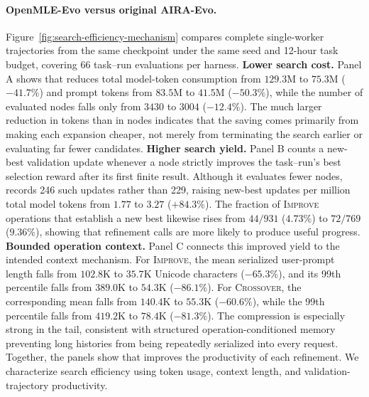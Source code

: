 \paragraph{OpenMLE-Evo versus original AIRA-Evo.}
Figure~\ref{fig:search-efficiency-mechanism} compares complete single-worker trajectories from the same \thirtyfivebmodel{} checkpoint under the same seed and 12-hour task budget, covering 66 task--run evaluations per harness.
\textbf{Lower search cost.}
Panel A shows that \openmleevo{} reduces total model-token consumption from $129.3$M to $75.3$M ($-41.7\%$) and prompt tokens from $83.5$M to $41.5$M ($-50.3\%$), while the number of evaluated nodes falls only from $3430$ to $3004$ ($-12.4\%$).
The much larger reduction in tokens than in nodes indicates that the saving comes primarily from making each expansion cheaper, not merely from terminating the search earlier or evaluating far fewer candidates.
\textbf{Higher search yield.}
Panel B counts a new-best validation update whenever a node strictly improves the task--run's best selection reward after its first finite result.
Although it evaluates fewer nodes, \openmleevo{} records 246 such updates rather than 229, raising new-best updates per million total model tokens from $1.77$ to $3.27$ ($+84.3\%$).
The fraction of \textsc{Improve} operations that establish a new best likewise rises from $44/931$ ($4.73\%$) to $72/769$ ($9.36\%$), showing that refinement calls are more likely to produce useful progress.
\textbf{Bounded operation context.}
Panel C connects this improved yield to the intended context mechanism.
For \textsc{Improve}, the mean serialized user-prompt length falls from $102.8$K to $35.7$K Unicode characters ($-65.3\%$), and its 99th percentile falls from $389.0$K to $54.3$K ($-86.1\%$).
For \textsc{Crossover}, the corresponding mean falls from $140.4$K to $55.3$K ($-60.6\%$), while the 99th percentile falls from $419.2$K to $78.4$K ($-81.3\%$).
The compression is especially strong in the tail, consistent with structured operation-conditioned memory preventing long histories from being repeatedly serialized into every request.
Together, the panels show that \openmleevo{} improves the productivity of each refinement.
We characterize search efficiency using token usage, context length, and validation-trajectory productivity.

